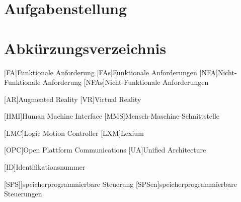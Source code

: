 \documentclass[12pt, a4paper, twoside]{article} %
\begin{document}
\section*{Aufgabenstellung}
\clearpage

\listoffigures
\clearpage

\listoftables
\clearpage

\section*{Abkürzungsverzeichnis}
\begin{acronym}[FA]
	[FA]{Funktionale Anforderung}
	[FAs]{Funktionale Anforderungen}
	[NFA]{Nicht-Funktionale Anforderung}
	[NFAs]{Nicht-Funktionale Anforderungen}
\end{acronym}
\begin{acronym}[VR]
	[AR]{Augmented Reality}
	[VR]{Virtual Reality}
\end{acronym}
\begin{acronym}[HMI]
	[HMI]{Human Machine Interface}
	[MMS]{Mensch-Maschine-Schnittstelle}
\end{acronym}
\begin{acronym}[LMC]
	[LMC]{Logic Motion Controller}
	[LXM]{Lexium}
\end{acronym}
\begin{acronym}[OPC]
	[OPC]{Open Plattform Communications}
	[UA]{Unified Architecture}
\end{acronym}
\begin{acronym}[ID]
	[ID]{Identifikationsnummer}
\end{acronym}
\begin{acronym}[SPS]
	[SPS]]{speicherprogrammierbare Steuerung}
	[SPSen]{speicherprogrammierbare Steuerungen}
\end{acronym}
\clearpage

\pagestyle{fancy}



\newpage

\end{document}
